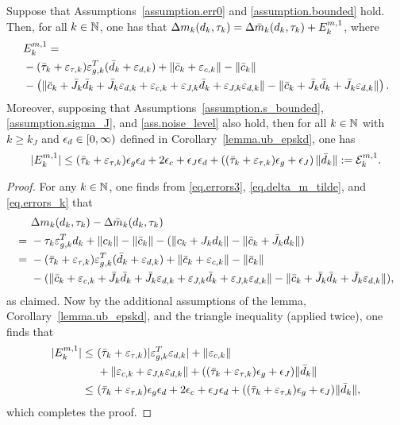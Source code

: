 \begin{lemma}\label{lemma.m1}
  Suppose that Assumptions~\ref{assumption.err0} and \ref{assumption.bounded} hold.  Then, for all $k \in \mathbb{N}$, one has that $\Delta m_k(d_k, \tau_k) = \Delta {\bar m}_k(d_k, \tau_k) + E_k^{m, 1}$, where 
  \begin{align*}
    & E_k^{m, 1}= \\
    & - ({\bar \tau}_k +  \varepsilon_{\tau,k}) \varepsilon_{g,k}^T( {\bar d}_k + \varepsilon_{d,k}) + \|{\bar c}_k + \varepsilon_{c,k} \| - \|{\bar c}_k\|\\
    &-\left(\|{\bar c}_k + {\bar J}_k {\bar d}_k + {\bar J}_k \varepsilon_{d,k}  + \varepsilon_{c,k} + \varepsilon_{J,k} {\bar d}_k + \varepsilon_{J,k} \varepsilon_{d,k}\| - \| {\bar c}_k + {\bar J}_k {\bar d}_k + {\bar J}_k \varepsilon_{d,k} \| \right).
  \end{align*}
  Moreover, supposing that Assumptions~\ref{assumption.s_bounded}, \ref{assumption.sigma_J}, and \ref{ass.noise_level} also hold, then for all $k \in \mathbb{N}$ with $k \geq k_J$ and $\epsilon_d \in [0,\infty)$ defined in Corollary~\ref{lemma.ub_epskd}, one has
  \begin{equation*}
    |E_k^{m, 1}| \leq ({\bar \tau}_k+   \varepsilon_{\tau,k}) \epsilon_g \epsilon_d +  2 \epsilon_c + \epsilon_J \epsilon_d + \left( ({\bar \tau}_k  +  \varepsilon_{\tau,k}) \epsilon_g + \epsilon_J\right) \| {\bar d}_k\| := \mathcal{E}_k^{m, 1}.
  \end{equation*}
\end{lemma}
\begin{proof}
  For any $k \in \mathbb{N}$, one finds from \eqref{eq.errors3}, \eqref{eq.delta_m_tilde}, and \eqref{eq.errors_k} that
  \begin{align*}
    &\ \Delta m_k(d_k, \tau_k) - \Delta {\bar m}_k(d_k, \tau_k)  \\
    =&\ - \tau_k \varepsilon_{g,k}^T d_k+ \|c_k\| - \|{\bar c}_k\| - (\|c_k + J_k d_k\| - \| {\bar c}_k + {\bar J}_k d_k \| )  \\
    =&\ - ({\bar \tau}_k +  \varepsilon_{\tau,k}) \varepsilon_{g,k}^T( {\bar d}_k + \varepsilon_{d,k})  + \|{\bar c}_k + \varepsilon_{c,k} \| - \|{\bar c}_k\|\\
     &\ - (\|{\bar c}_k + \varepsilon_{c,k} + {\bar J}_k {\bar d}_k + {\bar J}_k \varepsilon_{d,k} + \varepsilon_{J,k} {\bar d}_k + \varepsilon_{J,k} \varepsilon_{d,k}\| - \| {\bar c}_k + {\bar J}_k {\bar d}_k + {\bar J}_k \varepsilon_{d,k} \| ),
  \end{align*}
  as claimed.  Now by the additional assumptions of the lemma, Corollary~\ref{lemma.ub_epskd}, and the triangle inequality (applied twice), one finds that
  \begin{align*}
    |E_k^{m, 1}|
    \leq&\ ({\bar \tau}_k + \varepsilon_{\tau,k}) |\varepsilon_{g,k}^T \varepsilon_{d,k} | + \|\varepsilon_{c,k}\| \\
        &\ + \|\varepsilon_{c,k} +  \varepsilon_{J,k} \varepsilon_{d,k}\| + ( ({\bar \tau}_k + \varepsilon_{\tau,k}) \epsilon_g + \epsilon_J ) \| {\bar d}_k\| \\
    \leq&\ ({\bar \tau}_k+   \varepsilon_{\tau,k}) \epsilon_g \epsilon_d +  2 \epsilon_c + \epsilon_J \epsilon_d + ( ({\bar \tau}_k +  \varepsilon_{\tau,k}) \epsilon_g + \epsilon_J ) \| {\bar d}_k\|,
  \end{align*}
  which completes the proof.
\end{proof}

